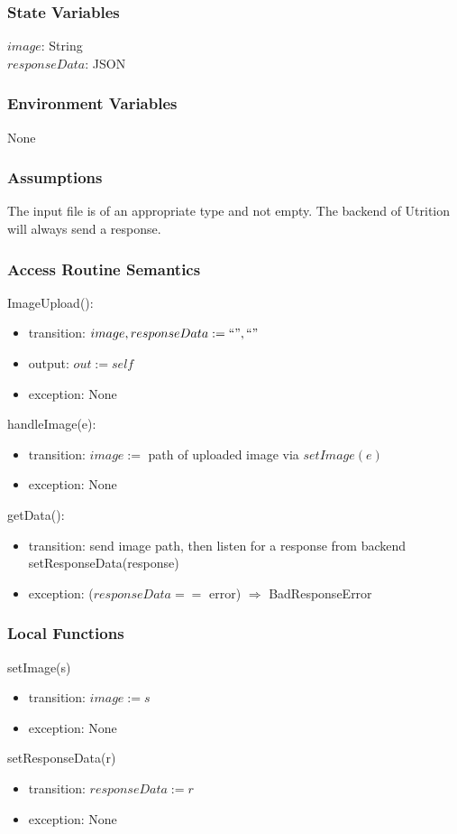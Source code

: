 \documentclass[12pt, titlepage]{article}
\begin{document}
\subsubsection{State Variables}
$image$: String\\
$responseData$: JSON
\subsubsection{Environment Variables}
None
\subsubsection{Assumptions}
The input file is of an appropriate type and not empty. The backend of Utrition will always send a response.
\subsubsection{Access Routine Semantics}
ImageUpload():
\begin{itemize}
	\item transition: $image, responseData := ``", ``"$
	\item output: $out := self$
	\item exception: None
\end{itemize}
\noindent
handleImage(e):
\begin{itemize}
	\item transition: $image :=$ path of uploaded image via $setImage(e)$
	\item exception: None
\end{itemize}
\noindent
getData():
\begin{itemize}
	\item transition: send image path, then listen for a response from 
	backend\\ setResponseData(response)
	\item exception: ($responseData ==$ error) $\Rightarrow$ BadResponseError
\end{itemize}
\subsubsection{Local Functions}
\noindent setImage(s)
\begin{itemize}
	\item transition: $ image :=s $
	\item exception: None
\end{itemize}
\noindent setResponseData(r)
\begin{itemize}
	\item transition: $ responseData:=r $
	\item exception: None
\end{itemize}
\end{document}
